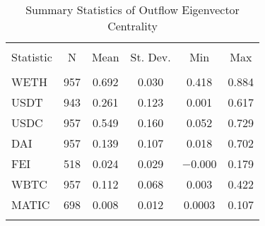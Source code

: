 
\begin{table}[!htbp] \centering 
  \caption{Summary Statistics of Outflow Eigenvector Centrality} 
  \label{} 
\begin{tabular}{@{\extracolsep{5pt}}lccccc} 
\\[-1.8ex]\hline 
\hline \\[-1.8ex] 
Statistic & \multicolumn{1}{c}{N} & \multicolumn{1}{c}{Mean} & \multicolumn{1}{c}{St. Dev.} & \multicolumn{1}{c}{Min} & \multicolumn{1}{c}{Max} \\ 
\hline \\[-1.8ex] 
WETH & 957 & 0.692 & 0.030 & 0.418 & 0.884 \\ 
USDT & 943 & 0.261 & 0.123 & 0.001 & 0.617 \\ 
USDC & 957 & 0.549 & 0.160 & 0.052 & 0.729 \\ 
DAI & 957 & 0.139 & 0.107 & 0.018 & 0.702 \\ 
FEI & 518 & 0.024 & 0.029 & $-$0.000 & 0.179 \\ 
WBTC & 957 & 0.112 & 0.068 & 0.003 & 0.422 \\ 
MATIC & 698 & 0.008 & 0.012 & 0.0003 & 0.107 \\ 
\hline \\[-1.8ex] 
\end{tabular} 
\end{table} 

